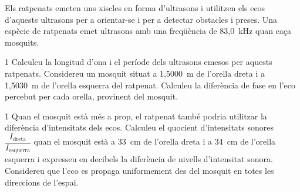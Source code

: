 Els ratpenats emeten uns xiscles en forma d'ultrasons i utilitzen els ecos d'aquests ultrasons per a orientar-se i per a detectar obstacles i preses. Una espècie de ratpenats emet ultrasons amb una freqüència de 83,0~kHz quan caça mosquits.


\begin{apartat}{1}
Calculeu la longitud d'ona i el període dels ultrasons emesos per aquests ratpenats. Considereu un mosquit situat a 1,5000~m de l'orella dreta i a 1,5030~m de l'orella esquerra del ratpenat. Calculeu la diferència de fase en l'eco percebut per cada orella, provinent del mosquit.
\end{apartat}

\begin{apartat}{1}
Quan el mosquit està més a prop, el ratpenat també podria utilitzar la diferència d'intensitats dels ecos. Calculeu el quocient d'intensitats sonores $\dfrac{I_\mathrm{dreta}}{I_\mathrm{esquerra}}$ quan el mosquit està a 33~cm de l'orella dreta i a 34~cm de l'orella esquerra i expresseu en decibels la diferència de nivells d'intensitat sonora. Considereu que l'eco es propaga uniformement des del mosquit en totes les direccions de l'espai.
\end{apartat}

